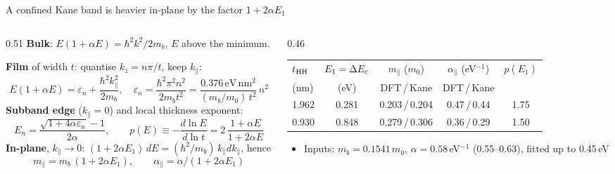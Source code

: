 \begin{frame}{A confined Kane band is heavier in-plane by the factor $1+2\alpha E_1$}
  \sixteenTop\sixteendense\sixteenEq
  \begin{columns}[T,onlytextwidth]
    \begin{column}{0.51\textwidth}
      \footnotesize
      \textbf{Bulk}: $E(1+\alpha E) = \hbar^2k^2/2m_b$, $E$ above the minimum.\par
      \vspace{0.8mm}
      \textbf{Film} of width $t$: quantise $k_z = n\pi/t$, keep $k_\parallel$:
      \[ E(1+\alpha E) = \varepsilon_n + \frac{\hbar^2k_\parallel^2}{2m_b},\quad
         \varepsilon_n = \frac{\hbar^2\pi^2n^2}{2m_bt^2} = \frac{0.376\,\mathrm{eV\,nm^2}}{(m_b/m_0)\,t^2}\,n^2 \]
      \textbf{Subband edge} ($k_\parallel = 0$) and local thickness exponent:
      \[ E_n = \frac{\sqrt{1+4\alpha\varepsilon_n}-1}{2\alpha},\qquad
         p(E) \equiv -\frac{d\ln E}{d\ln t} = 2\,\frac{1+\alpha E}{1+2\alpha E} \]
      \textbf{In-plane}, $k_\parallel \to 0$: $(1+2\alpha E_1)\,dE = (\hbar^2/m_b)\,k_\parallel dk_\parallel$, hence
      \[ m_\parallel = m_b\,(1+2\alpha E_1),\qquad \alpha_\parallel = \alpha/(1+2\alpha E_1) \]
    \end{column}
    \begin{column}{0.46\textwidth}
      \begingroup\scriptsize
      \setlength{\tabcolsep}{3.5pt}
      \renewcommand{\arraystretch}{1.1}
      \begin{tabular}{@{}l c c c c@{}}
        \toprule
        $t_{\mathrm{HH}}$ & $E_1 = \Delta E_{\mathrm{c}}$ & $m_\parallel$ ($m_0$) & $\alpha_\parallel$ (eV$^{-1}$) & $p(E_1)$ \\
        (nm) & (eV) & DFT\,/\,Kane & DFT\,/\,Kane & \\
        \midrule
        1.962 & 0.281 & 0.203\,/\,0.204 & 0.47\,/\,0.44 & 1.75 \\
        0.930 & 0.848 & 0.279\,/\,0.306 & 0.36\,/\,0.29 & 1.50 \\
        \bottomrule
      \end{tabular}\par\endgroup
      \vspace{0.4mm}
      \begin{itemize}
        \item Inputs: $m_b = 0.1541\,m_0$, $\alpha = 0.58$\,eV$^{-1}$ (0.55--0.63), fitted up to 0.45\,eV

\end{itemize}
\end{column}
\end{columns}
\end{frame}
